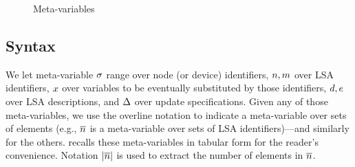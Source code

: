 \documentclass[12pt,a4paper,twoside,openright]{book}
\begin{document}
\begin{figure}[!t]{
 } \caption[Meta-variables for a SAPERE algebra]{Meta-variables} \label{fig:meta}
\end{figure}


\subsection{Syntax}

We let meta-variable $\sigma$ range over node (or device) identifiers, $n,m$ over LSA identifiers, $x$ over variables to be eventually substituted by those identifiers, $d,e$ over LSA descriptions, and $\Delta$ over update specifications. Given any of those meta-variables, we use the overline notation to indicate a meta-variable over sets of elements (e.g., $\overline{n}$ is a meta-variable over sets of LSA identifiers)---and similarly for the others.   recalls these meta-variables in tabular form for the reader's convenience. Notation $|\overline{n}|$ is used to extract the number of elements in $\overline{n}$.
\end{document}
